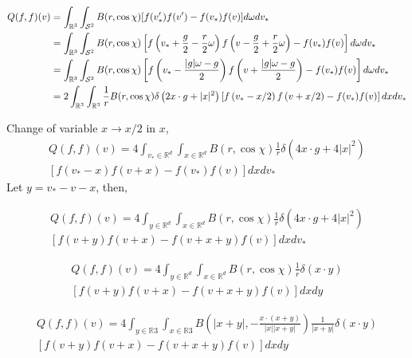 \documentclass[11pt]{amsart}
\begin{document}

\begin{align}
\begin{split}
Q(f,f)(v) &=  \int_{\mathbb{R}^3} \int_{\mathcal{S}^2} {B}(r,\cos\chi)[f(v_*')f(v')-f(v_*)f(v)] d\omega dv_* \\
& =  \int_{\mathbb{R}^3} \int_{\mathcal{S}^2} {B}(r,\cos\chi) \left[ 
f \left(v_* + {g\over2} - {r\over2} \omega  \right)f \left(v - {g\over2} + {r\over2} \omega \right)  - f(v_*)f(v) \right]  d\omega dv_* \\
& =  \int_{\mathbb{R}^3} \int_{\mathcal{S}^2} {B}(r,\cos\chi) \left[ 
f \left(v_* - {|g|\omega - g\over 2}\right)f \left(v +  {|g|\omega - g\over 2}\right) -f(v_*)f(v)\right]  d\omega dv_* \\
& =  2\int_{\mathbb{R}^3} \int_{\mathbb{R}^3} {1\over r}{B}(r,\cos\chi) \delta\left( 2x\cdot g + |x|^2 \right) \left[ 
f \left(v_* - x/2\right)f \left(v + x/2\right) -f(v_*)f(v)\right]  dx dv_* \\
\end{split}
\end{align}

Change of variable $x \to x/2$ in $x$,
\begin{multline}
Q(f, f)(v) =4 \int_{v_{*} \in \mathbb{R}^{d}} \int_{x \in \mathbb{R}^{d}} B\left(r,\cos\chi\right) \frac{1}{r} \delta\left(4 x \cdot g+4|x|^{2}\right) \\
 \left[f\left(v_{*}-x\right) f(v+x)-f\left(v_{*}\right) f(v)\right] d x d v_{*}
\end{multline}
Let $y = v_* - v - x$, then, 

\begin{multline*}
Q(f, f)(v) =4 \int_{y \in \mathbb{R}^{d}} \int_{x \in \mathbb{R}^{d}} B\left(r,\cos\chi\right) \frac{1}{r} \delta\left(4 x \cdot g+4|x|^{2}\right) \\
 \left[f\left(v+y\right) f(v+x)-f\left(v+x+y\right) f(v)\right] d x d v_{*}
\end{multline*}

\begin{multline*}
Q(f, f)(v) =4 \int_{y \in \mathbb{R}^{d}} \int_{x \in \mathbb{R}^{d}} B\left(r,\cos\chi\right) \frac{1}{r} \delta\left(x \cdot y\right) \\
 \left[f\left(v+y\right) f(v+x)-f\left(v+x+y\right) f(v)\right] d x d y
\end{multline*}

\begin{multline*}
Q(f, f)(v)=4 \int_{y \in \mathbb{R} 3} \int_{x \in \mathbb{R} 3} B\left(|x+y|,-\frac{x \cdot(x+y)}{|x||x+y|}\right) \frac{1}{|x+y|}\delta\left(x \cdot y\right) \\
 \left[f\left(v+y\right) f(v+x)-f\left(v+x+y\right) f(v)\right] d x d y
\end{multline*}
\end{document}
